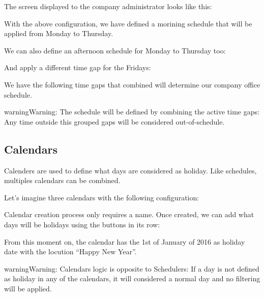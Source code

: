 \documentclass[letterpaper,10pt,english]{sphinxmanual}
\begin{document}
The screen displayed to the company administrator looks like this:

\noindent{}

With the above configuration, we have defined a morining schedule that will be
applied from Monday to Thursday.

We can also define an afternoon schedule for Monday to Thursday too:

\noindent{}

And apply a different time gap for the Fridays:

\noindent{}

We have the following time gaps that combined will determine our company
office schedule.

\noindent{}

\begin{notice}{warning}{Warning:}
The schedule will be defined by combining the active time gaps:
Any time outside this grouped gaps will be considered out-of-schedule.
\end{notice}


\subsection{Calendars}
\label{pbx_features/external_filters:calendars}
Calenders are used to define what days are considered as holiday. Like
schedules, multiples calendars can be combined.

Let's imagine three calendars with the following configuration:

\noindent{}

Calendar creation process only requires a name. Once created, we can add what
days will be holidays using the buttons in its row:

\noindent{}

From this moment on, the calendar has the 1st of January of 2016 as holiday
date with the locution ``Happy New Year''.

\begin{notice}{warning}{Warning:}
Calendars logic is opposite to Schedulers: If a day is not defined
as holiday in any of the calendars, it will considered a normal day and no
filtering will be applied.
\end{notice}
\end{document}
